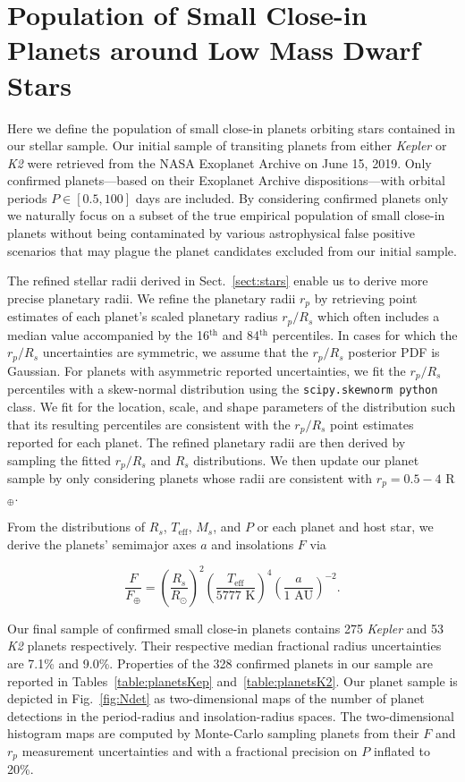 \documentclass[twocolumn]{emulateapj}
\newcommand{\kepler}[1]{\emph{Kepler}#1}
\newcommand{\ktwo}[1]{\emph{K2}#1}
\newcommand{\teff}[1]{$T_{\text{eff}}$#1}
\begin{document}
\section{Population of Small Close-in Planets around Low Mass Dwarf Stars} \label{sect:planets}
Here we define the population of small close-in planets orbiting stars contained in our stellar sample.
Our initial sample of transiting planets from either \kepler{} or \ktwo{} were retrieved from the
NASA Exoplanet Archive \citep{akeson13} on June 15, 2019. Only confirmed
planets---based on their Exoplanet Archive dispositions---with orbital periods
$P\in [0.5,100]$ days are included. By considering confirmed
planets only we naturally focus on a subset of the true empirical population of small close-in planets
without being contaminated by various astrophysical false positive scenarios that may plague the planet
candidates excluded from our initial sample.

The refined stellar radii derived in Sect.~\ref{sect:stars} enable us to derive more precise
planetary radii.
We refine the planetary radii $r_p$ by retrieving point estimates of each planet's scaled planetary radius
$r_p/R_s$ which often includes a median value 
accompanied by the 16$^{\text{th}}$ and 84$^{\text{th}}$ percentiles. In cases for which the $r_p/R_s$ uncertainties
are symmetric, we assume that the $r_p/R_s$ posterior PDF is Gaussian. For planets with asymmetric reported
uncertainties, we fit the $r_p/R_s$ percentiles with a skew-normal distribution using the
\texttt{scipy.skewnorm python} class. We fit for the location, scale, and shape parameters of the
distribution such that its resulting percentiles are consistent with
the $r_p/R_s$ point estimates reported for each planet. The refined planetary radii are then derived by sampling the
fitted $r_p/R_s$ and $R_s$ distributions. We then update our planet sample by
only considering planets whose radii are consistent with $r_p = 0.5-4$ R$_{\oplus}$.

From the distributions of $R_s$, \teff{,} $M_s$, and $P$ or each planet and host star, we derive the planets'
semimajor axes $a$ and insolations $F$ via

\begin{equation}
  \frac{F}{F_{\oplus}} = \left( \frac{R_s}{R_{\odot}} \right)^2  \left( \frac{T_{\text{eff}}}{5777 \text{ K}} \right)^4 \left( \frac{a}{1 \text{ AU}} \right)^{-2}.
\end{equation}

Our final sample of confirmed small close-in planets 
contains 275 \kepler{} and 53 \ktwo{} planets respectively. Their respective median fractional
radius uncertainties are 7.1\% and 9.0\%. Properties of the 328 confirmed planets in our sample
are reported in Tables~\ref{table:planetsKep} and~\ref{table:planetsK2}. Our planet sample is
depicted in Fig.~\ref{fig:Ndet} as two-dimensional maps of the number of planet detections in
the period-radius and insolation-radius spaces. The two-dimensional histogram maps are computed by
Monte-Carlo sampling planets from their $F$ and $r_p$
measurement uncertainties and with a fractional precision on $P$ inflated to 20\%.
\end{document}
